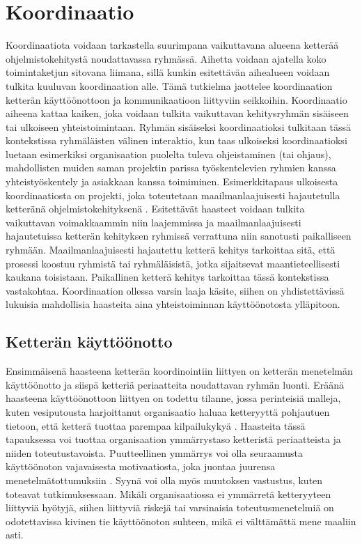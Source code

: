 \chapter{Koordinaatio}

Koordinaatiota voidaan tarkastella suurimpana vaikuttavana alueena ketterää ohjelmistokehitystä noudattavassa ryhmässä. Aihetta voidaan ajatella koko toimintaketjun sitovana liimana, sillä kunkin esitettävän aihealueen voidaan tulkita kuuluvan koordinaation alle. Tämä tutkielma jaottelee koordinaation ketterän käyttöönottoon ja kommunikaatioon liittyviin seikkoihin. Koordinaatio aiheena kattaa kaiken, joka voidaan tulkita vaikuttavan kehitysryhmän sisäiseen tai ulkoiseen yhteistoimintaan. Ryhmän sisäiseksi koordinaatioksi tulkitaan tässä kontekstissa ryhmäläisten välinen interaktio, kun taas ulkoiseksi koordinaatioksi luetaan esimerkiksi organisaation puolelta tuleva ohjeistaminen (tai ohjaus), mahdollisten muiden saman projektin parissa työskentelevien ryhmien kanssa yhteistyöskentely ja asiakkaan kanssa toimiminen. Esimerkkitapaus ulkoisesta koordinaatiosta on projekti, joka toteutetaan maailmanlaajuisesti hajautetulla ketteränä ohjelmistokehityksenä \cite{ALZOUBI201622}. Esitettävät haasteet voidaan tulkita vaikuttavan voimakkaammin niin laajemmissa ja maailmanlaajuisesti hajautetuissa ketterän kehityksen ryhmissä verrattuna niin sanotusti paikalliseen ryhmään. Maailmanlaajuisesti hajautettu ketterä kehitys tarkoittaa sitä, että prosessi koostuu ryhmistä tai ryhmäläisistä, jotka sijaitsevat maantieteellisesti kaukana toisistaan. Paikallinen ketterä kehitys tarkoittaa tässä kontekstissa vastakohtaa. Koordinaation ollessa varsin laaja käsite, siihen on yhdistettävissä lukuisia mahdollisia haasteita aina yhteistoiminnan käyttöönotosta ylläpitoon.

\section{Ketterän käyttöönotto}

Ensimmäisenä haasteena ketterän koordinointiin liittyen on ketterän menetelmän käyttöönotto ja siispä ketteriä periaatteita noudattavan ryhmän luonti. Eräänä haasteena käyttöönottoon liittyen on todettu tilanne, jossa perinteisiä malleja, kuten vesiputousta harjoittanut organisaatio haluaa ketteryyttä pohjautuen tietoon, että ketterä tuottaa parempaa kilpailukykyä \cite{MCKNIGHT2014168}. Haasteita tässä tapauksessa voi tuottaa organisaation ymmärrystaso ketteristä periaatteista ja niiden toteutustavoista. Puutteellinen ymmärrys voi olla seuraamusta käyttöönoton vajavaisesta motivaatiosta, joka juontaa juurensa menetelmätottumuksiin \cite{GREGORY201692}. Syynä voi olla myös muutoksen vastustus, kuten \cite{SELLERISILVA201520} toteavat tutkimuksessaan. Mikäli organisaatiossa ei ymmärretä ketteryyteen liittyviä hyötyjä, siihen liittyviä riskejä tai varsinaisia toteutusmenetelmiä on odotettavissa kivinen tie käyttöönoton suhteen, mikä ei välttämättä mene maaliin asti.

